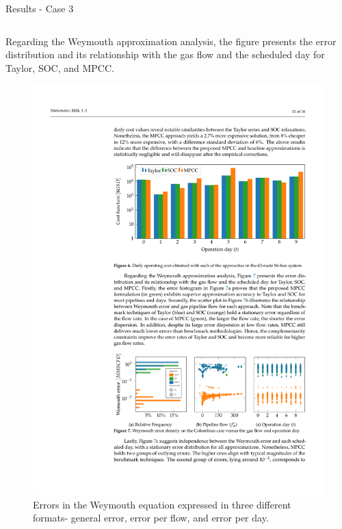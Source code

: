 \documentclass[hyperref={colorlinks,citecolor=blue,linkcolor=blue,urlcolor=blue}]{beamer}
\newlength\figureheight
\newlength\figurewidth
\begin{document}
\begin{frame}{Results - Case 3}
\begin{columns}[t,onlytextwidth]
    \begin{column}{0.48\textwidth}
        Regarding the Weymouth approximation analysis, the figure presents the error distribution and its relationship with the gas flow and the scheduled day for Taylor, SOC, and MPCC.
        
        \vspace{0.9em}
        
        \begin{figure}[H]
            \centering
            \setlength{}        
            \setlength{}
            \includegraphics[width=\figurewidth, height=\figureheight]{figures/case3_error.pdf} %
            \caption{\scriptsize Errors in the Weymouth equation expressed in three different formats- general error, error per flow, and error per day.}
            \label{fig:red_test_error}
        \end{figure}
    \end{column}
\end{columns}
\end{frame}
\end{document}
